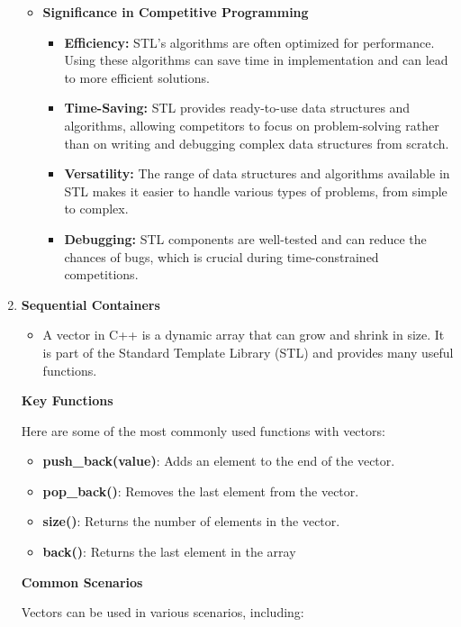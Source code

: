 \documentclass[12pt, letterpaper]{report}
\begin{document}
\begin{enumerate}
\begin{itemize}
	
	\item \textbf{Significance in Competitive Programming}
	\begin{itemize}
		\item \textbf{Efficiency:} STL's algorithms are often optimized for performance. Using these algorithms can save time in implementation and can lead to more efficient solutions.

    		\item \textbf{Time-Saving:} STL provides ready-to-use data structures and algorithms, allowing competitors to focus on problem-solving rather than on writing and debugging complex data structures from scratch.

    		\item \textbf{Versatility:} The range of data structures and algorithms available in STL makes it easier to handle various types of problems, from simple to complex.

    		\item \textbf{Debugging:} STL components are well-tested and can reduce the chances of bugs, which is crucial during time-constrained competitions.
    	\end{itemize}
\end{itemize}
\newpage
\item \textbf{Sequential Containers}
	\begin{itemize}
		\item A vector in C++ is a dynamic array that can grow and shrink in size. It is part of the Standard Template Library (STL) and provides many useful functions.
	\end{itemize}

\textbf{Key Functions}

Here are some of the most commonly used functions with vectors:

\begin{itemize}
    \item \textbf{push\_back(value)}: Adds an element to the end of the vector.
    \item \textbf{pop\_back()}: Removes the last element from the vector.
    \item \textbf{size()}: Returns the number of elements in the vector.
    \item \textbf{back()}: Returns the last element in the array
\end{itemize}
\textbf{Common Scenarios}

Vectors can be used in various scenarios, including:


\end{enumerate}
\end{document}
